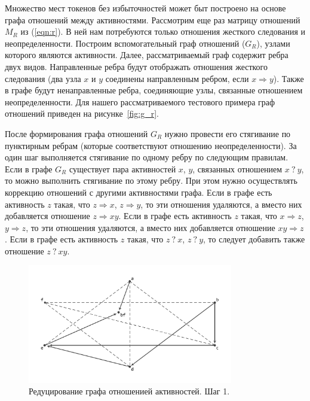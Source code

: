 \documentclass[
11pt,%
tightenlines,%
twoside,%
onecolumn,%
nofloats,%
nobibnotes,%
nofootinbib,%
superscriptaddress,%
noshowpacs,%
centertags]%
{revtex4}
\begin{document}
Множество мест токенов без избыточностей может быт построено на основе графа отношений между активностями.
Рассмотрим еще раз матрицу отношений $M_R$ из (\ref{eqn:r}).
В ней нам потребуются только отношения жесткого следования и неопределенности.
Построим вспомогательный граф отношений ($G_R$), узлами которого являются активности.
Далее, рассматриваемый граф содержит ребра двух видов.
Направленные ребра будут отображать отношения жесткого следования (два узла $x$ и $y$ соединены направленным ребром, если $x \Rightarrow y$).
Также в графе будут ненаправленные ребра, соединяющие узлы, связанные отношением неопределенности.
Для нашего рассматриваемого тестового примера граф отношений приведен на рисунке~\ref{fig:g_r}.

После формирования графа отношений $G_R$ нужно провести его стягивание по пунктирным ребрам (которые соответствуют отношению неопределенности).
За один шаг выполняется стягивание по одному ребру по следующим правилам.
Если в графе $G_R$ существует пара активностей $x$, $y$, связанных отношением $x \ ? \ y$, то можно выполнить стягивание по этому ребру.
При этом нужно осуществлять коррекцию отношений с другими активностями графа.
Если в графе есть активность $z$ такая, что $z \Rightarrow x$, $z \Rightarrow y$, то эти отношения удаляются, а вместо них добавляется отношение $z \Rightarrow xy$.
Если в графе есть активность $z$ такая, что $x \Rightarrow z$, $y \Rightarrow z$, то эти отношения удаляются, а вместо них добавляется отношение $xy \Rightarrow z$.
Если в графе есть активность $z$ такая, что $z \ ? \ x$, $z \ ? \ y$, то следует добавить также отношение $z \ ? \ xy$.

\begin{figure}[h]
\setcaptionmargin{5mm}
\includegraphics[width=0.8\textwidth]{pics/g_r_reduce1.pdf}
\caption{Редуцирование графа отношенией активностей. Шаг 1.}
\label{fig:g_r_reduce1}
\end{figure}
\end{document}
